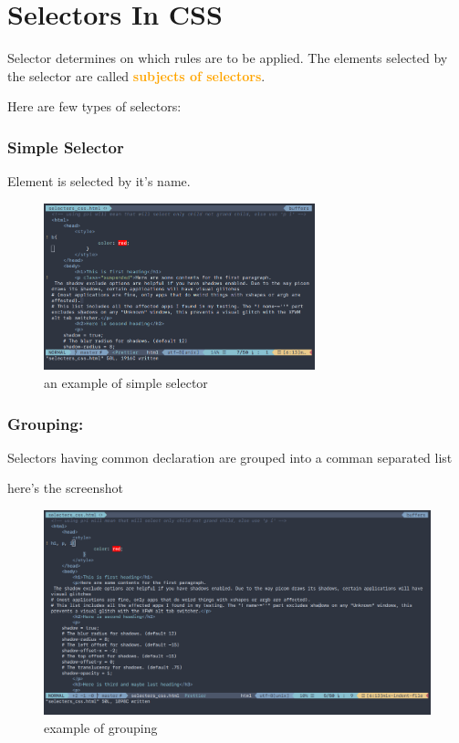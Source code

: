 \documentclass[a4paper,1pt,oneside]{article}
\begin{document}
\section{Selectors In CSS}

\noindent Selector determines on which rules are to be applied. The elements selected by the selector are called \textcolor{orange}{\textbf{subjects of selectors}}.

Here are few types of selectors:

\subsubsection{Simple Selector}

Element is selected by it's name.

\begin{figure}[hbt!]
	\centering
	\includegraphics[width=0.7\textwidth]{images/2020-03-24-002817_843x519_scrot.png}
	\caption{an example of simple selector}
\end{figure}

\subsubsection{Grouping:}
Selectors having common declaration are grouped into a comman separated list

here's the screenshot

\begin{figure}[hbt!]
	\centering
	\includegraphics[width=1\textwidth]{images/2020-03-23-225413_1302x688_scrot.png}
	\caption{example of grouping}
\end{figure}
\end{document}
